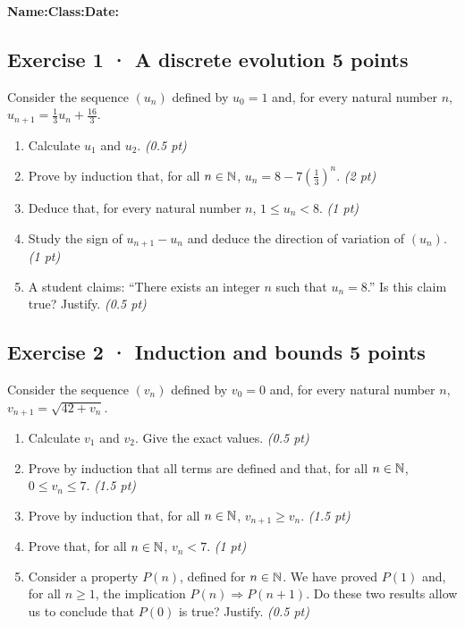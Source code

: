 \smallskip\textbf{Name:}\enspace\dotfill\quad\textbf{Class:}\enspace\dotfill\quad\textbf{Date:}\enspace\dotfill

\subsection*{Exercise 1 · A discrete evolution \hfill 5 points}Consider the sequence $(u_n)$ defined by $u_0=1$ and, for every natural number $n$, $u_{n+1}=\frac{1}{3}u_n+\frac{16}{3}$.

\begin{enumerate}

\item Calculate $u_1$ and $u_2$. \hfill\textit{(0.5 pt)}

\item Prove by induction that, for all $n\in\mathbb N$, $u_n=8-7\left(\frac{1}{3}\right)^n$. \hfill\textit{(2 pt)}

\item Deduce that, for every natural number $n$, $1\le u_n<8$. \hfill\textit{(1 pt)}

\item Study the sign of $u_{n+1}-u_n$ and deduce the direction of variation of $(u_n)$. \hfill\textit{(1 pt)}

\item A student claims: ``There exists an integer $n$ such that $u_n=8$.'' Is this claim true? Justify. \hfill\textit{(0.5 pt)}

\end{enumerate}

\subsection*{Exercise 2 · Induction and bounds \hfill 5 points}Consider the sequence $(v_n)$ defined by $v_0=0$ and, for every natural number $n$, $v_{n+1}=\sqrt{42+v_n}$.

\begin{enumerate}

\item Calculate $v_1$ and $v_2$. Give the exact values. \hfill\textit{(0.5 pt)}

\item Prove by induction that all terms are defined and that, for all $n\in\mathbb N$, $0\le v_n\le7$. \hfill\textit{(1.5 pt)}

\item Prove by induction that, for all $n\in\mathbb N$, $v_{n+1}\ge v_n$. \hfill\textit{(1.5 pt)}

\item Prove that, for all $n\in\mathbb N$, $v_n<7$. \hfill\textit{(1 pt)}

\item Consider a property $P(n)$, defined for $n\in\mathbb N$. We have proved $P(1)$ and, for all $n\ge1$, the implication $P(n)\Rightarrow P(n+1)$. Do these two results allow us to conclude that $P(0)$ is true? Justify. \hfill\textit{(0.5 pt)}

\end{enumerate}

